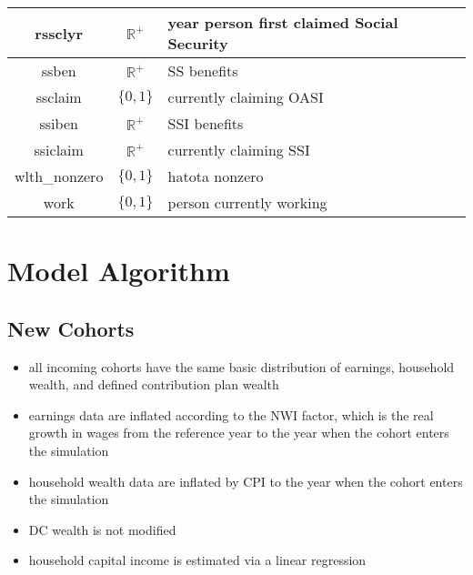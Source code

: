 \documentclass{article}
\begin{document}
\begin{table}[ht]
\begin{tabular}{|c|c|l|}
rssclyr & $\mathbb{R}^+$ & year person first claimed Social Security\\\hline
ssben & $\mathbb{R}^+$ & SS benefits\\\hline
ssclaim & $\{0, 1\}$ & currently claiming OASI\\\hline
ssiben & $\mathbb{R}^+$ & SSI benefits\\\hline
ssiclaim & $\mathbb{R}^+$ & currently claiming SSI\\\hline
wlth\_nonzero & $\{0, 1\}$ & hatota nonzero\\\hline
work & $\{0, 1\}$ & person currently working\\\hline
\end{tabular}
\label{tab:variables}
\end{table}

\section{Model Algorithm}

\subsection{New Cohorts}
\label{sec:new}
\begin{itemize}
\item all incoming cohorts have the same basic distribution of earnings, household wealth, and defined contribution plan wealth
\item earnings data are inflated according to the NWI factor, which is the real growth in wages from the reference year to the year when the cohort enters the simulation
\item household wealth data are inflated by CPI to the year when the cohort enters the simulation
\item DC wealth is not modified
\item household capital income is estimated via a linear regression
\end{itemize}
\end{document}
